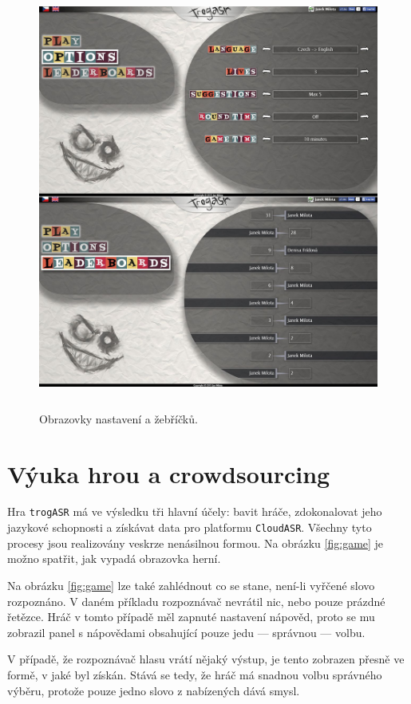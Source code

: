 \begin{figure}[h]
	\centering
	\includegraphics[width=140mm,height=140mm]{img/competitivity.jpg}
	\caption{Obrazovky nastavení a žebříčků.}
	\label{fig:competitivity}
\end{figure}

\section{Výuka hrou a crowdsourcing}

Hra \verb|trogASR| má ve výsledku tři hlavní účely: bavit hráče, zdokonalovat jeho jazykové schopnosti a získávat data pro platformu \verb|CloudASR|. Všechny tyto procesy jsou realizovány veskrze nenásilnou formou. Na obrázku \ref{fig:game} je možno spatřit, jak vypadá obrazovka herní. 

Na obrázku \ref{fig:game} lze také zahlédnout co se stane, není-li vyřčené slovo rozpoznáno. V daném příkladu rozpoznávač nevrátil nic, nebo pouze prázdné řetězce. Hráč v tomto případě měl zapnuté nastavení nápověd, proto se mu zobrazil panel s nápovědami obsahující pouze jedu --- správnou --- volbu.

V případě, že rozpoznávač hlasu vrátí nějaký výstup, je tento zobrazen přesně ve formě, v jaké byl získán. Stává se tedy, že hráč má snadnou volbu správného výběru, protože pouze jedno slovo z nabízených dává smysl.

